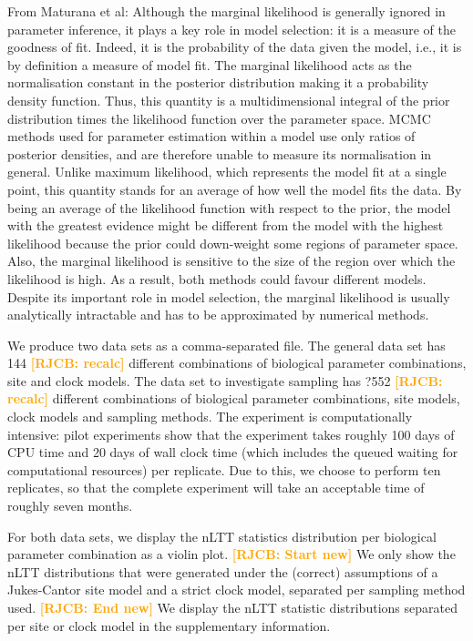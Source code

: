 \documentclass{article}
\newcommand*\richel[1]{\textcolor{orange}{\textbf{[RJCB: #1]}}}
\begin{document}
From Maturana et al:
Although the marginal likelihood is generally ignored in parameter inference, it plays a key role in model
selection: it is a measure of the goodness of fit. Indeed, it is the probability of the data given the model,
i.e., it is by definition a measure of model fit. The marginal likelihood acts as the normalisation constant in
the posterior distribution making it a probability density function. Thus, this quantity is a multidimensional
integral of the prior distribution times the likelihood function over the parameter space. MCMC methods
used for parameter estimation within a model use only ratios of posterior densities, and are therefore unable
to measure its normalisation in general.
Unlike maximum likelihood, which represents the model fit at a single point, this quantity stands for an average
of how well the model fits the data. By being an average of the likelihood function with respect to the prior,
the model with the greatest evidence might be different from the model with the highest likelihood because
the prior could down-weight some regions of parameter space. Also, the marginal likelihood is sensitive to the
size of the region over which the likelihood is high. As a result, both methods could favour different models.
Despite its important role in model selection, the marginal likelihood is usually analytically intractable and
has to be approximated by numerical methods.



We produce two data sets as a comma-separated file.
The general data set has 144 \richel{recalc} different combinations
of biological parameter combinations, site and clock models.
The data set to investigate sampling has ?552 \richel{recalc} different combinations
of biological parameter combinations, site models, clock models 
and sampling methods. The experiment is computationally intensive:
pilot experiments show that the experiment takes roughly 100 days
of CPU time and 20 days of wall clock time (which includes the queued 
waiting for computational resources) per replicate. 
Due to this, we choose to perform ten replicates, so that the complete
experiment will take an acceptable time of roughly seven months. 

For both data sets, we display the nLTT statistics distribution per
biological parameter combination as a violin plot.
\richel{Start new}
We only show the nLTT distributions
that were generated under the (correct) assumptions of a Jukes-Cantor site model
and a strict clock model, separated per sampling method used. 
\richel{End new}
We display the nLTT statistic distributions separated per site or clock model 
in the supplementary information.
\end{document}
